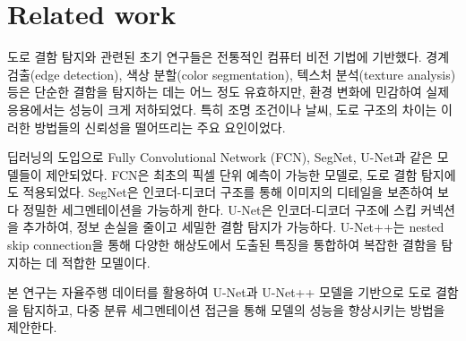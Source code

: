 \section{Related work}

도로 결함 탐지와 관련된 초기 연구들은 전통적인 컴퓨터 비전 기법에 기반했다. 경계 검출(edge detection), 색상 분할(color segmentation), 텍스처 분석(texture analysis) 등은 단순한 결함을 탐지하는 데는 어느 정도 유효하지만, 환경 변화에 민감하여 실제 응용에서는 성능이 크게 저하되었다. 특히 조명 조건이나 날씨, 도로 구조의 차이는 이러한 방법들의 신뢰성을 떨어뜨리는 주요 요인이었다.

딥러닝의 도입으로 Fully Convolutional Network (FCN), SegNet, U-Net과 같은 모델들이 제안되었다. FCN은 최초의 픽셀 단위 예측이 가능한 모델로, 도로 결함 탐지에도 적용되었다. SegNet은 인코더-디코더 구조를 통해 이미지의 디테일을 보존하여 보다 정밀한 세그멘테이션을 가능하게 한다. U-Net은 인코더-디코더 구조에 스킵 커넥션을 추가하여, 정보 손실을 줄이고 세밀한 결함 탐지가 가능하다. U-Net++는 nested skip connection을 통해 다양한 해상도에서 도출된 특징을 통합하여 복잡한 결함을 탐지하는 데 적합한 모델이다.

본 연구는 자율주행 데이터를 활용하여 U-Net과 U-Net++ 모델을 기반으로 도로 결함을 탐지하고, 다중 분류 세그멘테이션 접근을 통해 모델의 성능을 향상시키는 방법을 제안한다.
